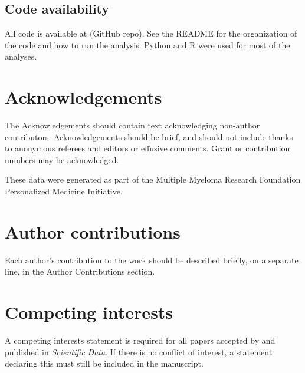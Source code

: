 \documentclass[english, 12pt, letterpaper]{article}
\begin{document}
\subsection*{Code availability}

All code is available at (GitHub repo).
See the README for the organization of the code and how to run the analysis.
Python \cite{van1995python} and R \cite{Rlang} were used for most of the analyses.



\section*{Acknowledgements}

The Acknowledgements should contain text acknowledging non-author contributors.
Acknowledgements should be brief, and should not include thanks to anonymous referees and editors or effusive comments.
Grant or contribution numbers may be acknowledged.

These data were generated as part of the Multiple Myeloma Research Foundation Personalized Medicine Initiative.

\section*{Author contributions}

Each author’s contribution to the work should be described briefly, on a separate line, in the Author Contributions section. 

\section*{Competing interests}

A competing interests statement is required for all papers accepted by and published in \emph{Scientific Data}. If there is no conflict of interest, a statement declaring this must still be included in the manuscript.



{}
\end{document}

